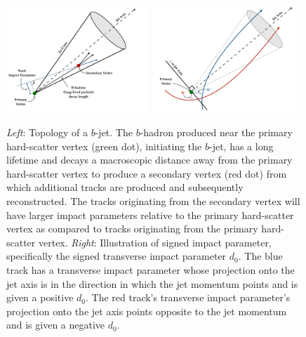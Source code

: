 \begin{figure}[!htb]
    \begin{center}
        \includegraphics[width=0.48\textwidth]{figures/chapter3/ftag/bhadron_decayPDF}
        \includegraphics[width=0.48\textwidth]{figures/chapter3/ftag/bhadron_signed_d0PDF}
        \caption{
            \textit{Left}:
            Topology of a $b$-jet.
            The $b$-hadron produced near the primary hard-scatter vertex (green dot), initiating the
            $b$-jet, has a long lifetime and decays a macroscopic distance away from the primary
            hard-scatter vertex to produce a secondary vertex (red dot) from which additional tracks
            are produced and subsequently reconstructed.
            The tracks originating from the secondary vertex will have larger impact parameters relative
            to the primary hard-scatter vertex as compared to tracks originating from the primary
            hard-scatter vertex.
            \textit{Right}:
            Illustration of signed impact parameter, specifically the signed transverse impact
            parameter $d_0$. The blue track has a transverse impact parameter whose projection onto the jet axis
            is in the direction in which the jet momentum points and is given a positive $d_0$.
            The red track's transverse impact parameter's projection onto the jet axis points opposite to the jet
            momentum and is given a negative $d_0$.
        }
        \label{fig:bjet_decay}
    \end{center}
\end{figure}

